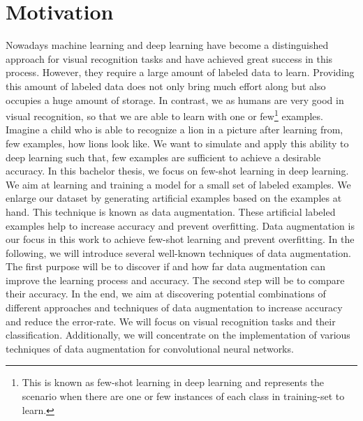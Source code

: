 \chapter{Motivation}
Nowadays machine learning and deep learning have become a distinguished approach for visual
recognition tasks and have achieved great success in this process. However, they require a large amount of
labeled data to learn. Providing this amount of labeled data does not only bring much effort along
but also occupies a huge amount of storage. In
contrast, we as humans are very good in visual recognition, so that we are able to learn with one or few\footnote{This is known as few-shot learning in
  deep learning and represents the scenario when there are one or few instances of each class in
  training-set to learn.}
examples. Imagine a child who is able to recognize a lion in a picture
after learning from, few examples, how lions look like. We want to simulate and apply this ability to deep learning
such that, few examples are sufficient to achieve a desirable accuracy.
In this bachelor thesis, we focus on few-shot learning in deep learning. We aim at
learning and training a model for a small set of labeled examples. We enlarge our dataset by
generating artificial examples based on the examples at hand. This technique is known as data
augmentation. These artificial labeled examples help to increase accuracy and prevent overfitting. Data augmentation is our focus in this work to achieve few-shot
learning and prevent overfitting. In the following, we will introduce several well-known techniques
of data augmentation. The first purpose will be to discover if and how far data augmentation can
improve the learning process and accuracy. The second step will be to compare their accuracy. In
the end, we aim at discovering potential combinations of different approaches and techniques of data
augmentation to increase accuracy and reduce the error-rate.
We will focus on visual recognition tasks and their classification. Additionally, we will
concentrate on the implementation of various techniques of data augmentation for convolutional
neural networks.


